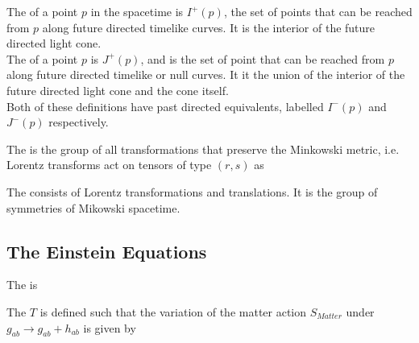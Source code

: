 \documentclass{article}
\begin{document}
\begin{definition}
The  of a point $p$ in the spacetime is $I^+(p)$, the set of points that can be reached from $p$ along future directed timelike curves. It is the interior of the future directed light cone. \\
The  of a point $p$ is $J^+(p)$, and is the set of point that can be reached from $p$ along future directed timelike or null curves. It it the union of the interior of the future directed light cone and the cone itself. \\
Both of these definitions have past directed equivalents, labelled $I^-(p)$ and $J^-(p)$ respectively. 
\end{definition}

\begin{definition}
The  is the group of all transformations that preserve the Minkowski metric, i.e. 
Lorentz transforms act on tensors of type $(r,s)$ as 
\end{definition}

\begin{definition}
The  consists of Lorentz transformations and translations. It is the group of symmetries of Mikowski spacetime. 
\end{definition}

\subsection{The Einstein Equations}

\begin{definition}
The  is 
\end{definition}


\begin{definition}
The  $T$ is defined such that the variation of the matter action $S_{Matter}$ under $g_{ab} \to g_{ab} + h_{ab}$ is given by 
\end{definition}
\end{document}
